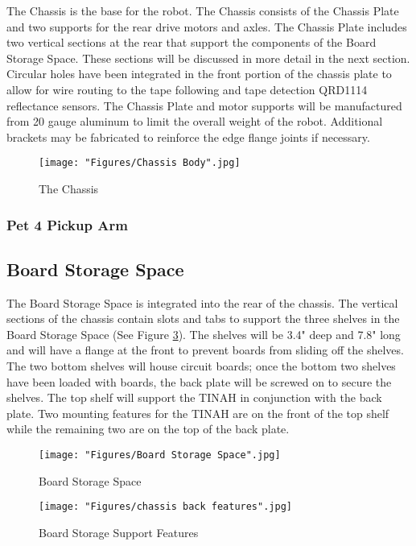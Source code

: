 \documentclass[11pt, oneside]{article} %
\begin{document}
	The Chassis is the base for the robot. The Chassis consists of the Chassis Plate and two supports for the rear drive motors and axles. The Chassis Plate includes two vertical sections at the rear that support the components of the Board Storage Space. These sections will be discussed in more detail in the next section. Circular holes have been integrated in the front portion of the chassis plate to allow for wire routing to the tape following and tape detection QRD1114 reflectance sensors. The Chassis Plate and motor supports will be manufactured from 20 gauge aluminum to limit the overall weight of the robot. Additional brackets may be fabricated to reinforce the edge flange joints if necessary. 

	\begin{figure}[h]
		\centering
		\texttt{[image: "Figures/Chassis Body".jpg]}
		\caption[Chassis]{The Chassis}
		\label{fig:1}
	\end{figure}

	\subsubsection{Pet 4 Pickup Arm}
	
	\subsection{Board Storage Space}

	The Board Storage Space is integrated into the rear of the chassis. The vertical sections of the chassis contain slots and tabs to support the three shelves in the Board Storage Space (See Figure \ref{fig:3}). The shelves will be 3.4" deep and 7.8" long and will have a flange at the front to prevent boards from sliding off the shelves. The two bottom shelves will house circuit boards; once the bottom two shelves have been loaded with boards, the back plate will be screwed on to secure the shelves. The top shelf will support the TINAH in conjunction with the back plate. Two mounting features for the TINAH are on the front of the top shelf while the remaining two are on the top of the back plate.

	\begin{figure}[h]
		\centering
		\texttt{[image: "Figures/Board Storage Space".jpg]}
		\caption[Board Storage Space]{Board Storage Space}
		\label{fig:2}
	\end{figure}

	\begin{figure}[h]
		\centering
		\texttt{[image: "Figures/chassis back features".jpg]}
		\caption[Board Storage Support Features]{Board Storage Support Features}
		\label{fig:3}
	\end{figure}
\end{document}
